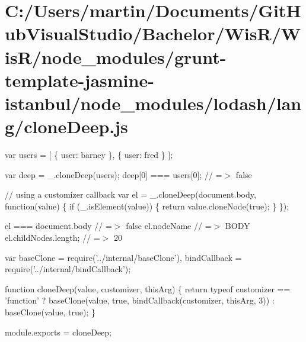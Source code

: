 \hypertarget{_c_1_2_users_2martin_2_documents_2_git_hub_visual_studio_2_bachelor_2_wis_r_2_wis_r_2node_module094e620347afd2cbd621d7e2eec4c069}{}\section{C\+:/\+Users/martin/\+Documents/\+Git\+Hub\+Visual\+Studio/\+Bachelor/\+Wis\+R/\+Wis\+R/node\+\_\+modules/grunt-\/template-\/jasmine-\/istanbul/node\+\_\+modules/lodash/lang/clone\+Deep.\+js}
var users = \mbox{[} \{ \textquotesingle{}user\textquotesingle{}\+: \textquotesingle{}barney\textquotesingle{} \}, \{ \textquotesingle{}user\textquotesingle{}\+: \textquotesingle{}fred\textquotesingle{} \} \mbox{]};

var deep = \+\_\+.\+clone\+Deep(users); deep\mbox{[}0\mbox{]} === users\mbox{[}0\mbox{]}; // =$>$ false

// using a customizer callback var el = \+\_\+.\+clone\+Deep(document.\+body, function(value) \{ if (\+\_\+.\+is\+Element(value)) \{ return value.\+clone\+Node(true); \} \});

el === document.\+body // =$>$ false el.\+node\+Name // =$>$ B\+O\+D\+Y el.\+child\+Nodes.\+length; // =$>$ 20


\begin{DoxyCodeInclude}
var baseClone = require(\textcolor{stringliteral}{'../internal/baseClone'}),
    bindCallback = require(\textcolor{stringliteral}{'../internal/bindCallback'});

\textcolor{keyword}{function} cloneDeep(value, customizer, thisArg) \{
  \textcolor{keywordflow}{return} typeof customizer == \textcolor{stringliteral}{'function'}
    ? baseClone(value, \textcolor{keyword}{true}, bindCallback(customizer, thisArg, 3))
    : baseClone(value, true);
\}

module.exports = cloneDeep;
\end{DoxyCodeInclude}
 